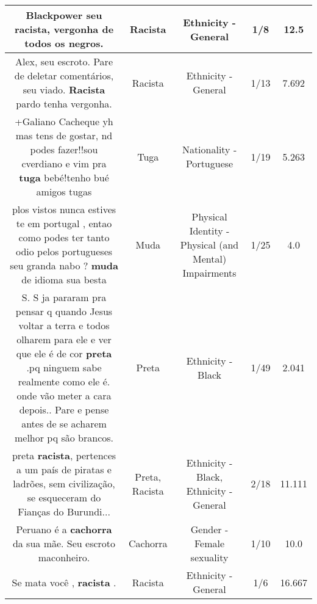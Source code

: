 \documentclass[11pt]{article}
\newlength\mylength
\begin{document}
\begin{center}
\begin{longtable}{|C{.65\mylength}|C{.30\mylength}|C{.12\mylength}|C{.12\mylength}|C{.12\mylength}|}
  \small Blackpower seu \textbf{racista}, vergonha de todos os negros.\normalsize   & Racista & Ethnicity - General & 1/8 & 12.5 \\  \hline
  \small Alex, seu escroto. Pare de deletar comentários, seu viado. \textbf{Racista} pardo tenha vergonha.\normalsize   & Racista & Ethnicity - General & 1/13 & 7.692 \\  \hline
  \small +Galiano Cacheque yh mas tens de gostar, nd  podes fazer!!sou cverdiano e vim pra \textbf{tuga} bebé!tenho bué amigos tugas\normalsize   & Tuga & Nationality - Portuguese & 1/19 & 5.263 \\  \hline
  \small plos vistos nunca estives te em portugal , entao como podes ter tanto odio pelos portugueses seu granda nabo ? \textbf{muda} de idioma sua besta\normalsize   & Muda & Physical Identity - Physical (and Mental) Impairments & 1/25 & 4.0 \\  \hline
  \small S. S  ja pararam pra pensar q quando Jesus voltar a terra e todos olharem  para ele e ver que ele é de cor \textbf{preta} .pq ninguem sabe realmente como ele é. onde vão meter a cara depois.. Pare e pense antes de se acharem melhor pq são brancos.\normalsize   & Preta & Ethnicity - Black & 1/49 & 2.041 \\  \hline
  \small preta \textbf{racista}, pertences a um país de piratas e ladrões, sem civilização, se esqueceram do Fianças do Burundi...\normalsize   & Preta, Racista & Ethnicity - Black, Ethnicity - General & 2/18 & 11.111 \\  \hline
  \small Peruano é a \textbf{cachorra} da sua mãe. Seu escroto maconheiro.\normalsize   & Cachorra & Gender - Female sexuality & 1/10 & 10.0 \\  \hline
  \small Se mata você , \textbf{racista} .\normalsize   & Racista & Ethnicity - General & 1/6 & 16.667 \\  \hline

\end{longtable}
\end{center}
\end{document}
